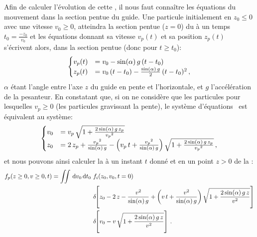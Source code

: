 Afin de calculer l'évolution de cette \fdd, il nous faut connaître les équations du mouvement dans la section pentue du guide. Une particule initialement en $z_0 \leq 0$ avec une vitesse $v_0 \geq 0$, atteindra la section pentue ($z=0$) du \gm à un temps $t_0 = \tfrac{-z_0}{v_0}$ et les équations donnant sa vitesse $v_p(t)$ et sa position $z_p(t)$ s'écrivent alors, dans la section pentue (donc pour $t \geq t_0$):
\begin{equation}
	\begin{cases}
	v_p(t) &= v_0 - \sinalpha \, g \, (t-t_0) \\
	z_p(t) &= v_0 \, (t-t_0) - \frac{\sinalpha \, g}{2} \, (t-t_0)^2
	\virguleformule
	\end{cases}
	\label{eq:MouvementPente}
\end{equation}
$\alpha$ étant l'angle entre l'axe $z$ du guide en pente et l'horizontale, et $g$ l'accélération de la pesanteur. En constatant que, si on ne considère que les particules pour lesquelles $v_p \geq 0$ (\cad les particules gravissant la pente), le système d'équations~ est équivalent au système:
\begin{equation}
	\begin{cases}
	v_0 &= v_p \, \sqrt{1 + \frac{2 \, \sinalpha \, g \, z_p}{{v_p}^2}} \\
	z_0 &= 2\,z_p
	+\frac{{v_p}^2}{\sinalpha\,g}
	- \left(	{v_p}\,t + \frac{{v_p}^2}{\sinalpha\,g}  \right)
	\sqrt{1 + \frac{2\,\sinalpha\,g\,z_p}{{v_p}^2}}
	\virguleformule
	\end{cases}
	\label{eq:MouvementPenteBis}
\end{equation}
et nous pouvons ainsi calculer la \fdddedpup à un instant $t$ donné et en un point $z>0$ de la \secpent:
\begin{align}
	f_p(z\geq0, v\geq0, t) = 
	 \iint \ddint v_0 \ddint t_0 \, \,
	& f_i(z_0, v_0, t=0) 	 \nonumber \\
	& \Dirac{z_0 - 2\,z
	-\frac{{v}^2}{\sinalpha\,g}
	+ \left(	{v}\,t + \frac{{v}^2}{\sinalpha\,g}  \right)
	\sqrt{1 + \frac{2\,\sinalpha\,g\,z}{{v}^2}}}	 \nonumber \\
	& \Dirac{v_0 - v\,\sqrt{1 + \frac{2\,\sinalpha\,g\,z}{{v}^2}}} 
	\pointformule
	\label{eq:fpPente}
\end{align}

